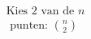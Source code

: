 \documentclass[preview]{standalone}
\begin{document}
\begin{align*}
\text{Kies }2\text{ van de }n\\\text{ punten: }{n\choose 2}
\end{align*}
\end{document}
